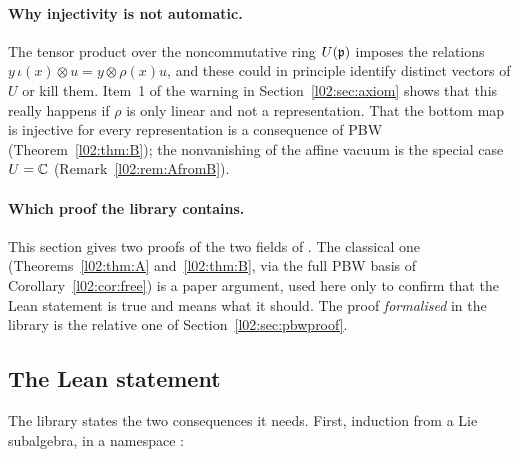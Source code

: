 \paragraph{Why injectivity is not automatic.} The tensor product over the noncommutative ring
$U(\mathfrak{p})$ imposes the relations $y\,\iota(x)\otimes u = y\otimes\rho(x)u$, and these could in principle
identify distinct vectors of $U$ or kill them. Item~1 of the warning in
Section~\ref{l02:sec:axiom} shows that this really happens if $\rho$ is only linear and not a
representation. That the bottom map is injective for every representation is a consequence of PBW
(Theorem~\ref{l02:thm:B}); the nonvanishing of the affine vacuum is the special case $U = {\mathbb{C}}$
(Remark~\ref{l02:rem:AfromB}).

\paragraph{Which proof the library contains.} This section gives two proofs of the two fields of
. The classical one (Theorems~\ref{l02:thm:A} and~\ref{l02:thm:B}, via the full PBW basis of
Corollary~\ref{l02:cor:free}) is a paper argument, used here only to confirm that the Lean statement is
true and means what it should. The proof \emph{formalised} in the library is the relative one of
Section~\ref{l02:sec:pbwproof}.

\subsection{The Lean statement}

The library states the two consequences it needs. First, induction from a Lie subalgebra, in a
namespace :

